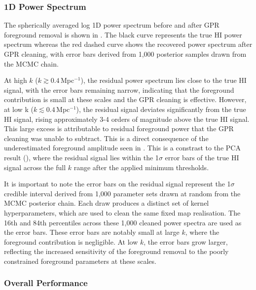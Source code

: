 \subsubsection{1D Power Spectrum}

The spherically averaged log 1D power spectrum before and after GPR foreground removal is shown in . The black curve represents the true HI power spectrum whereas the red dashed curve shows the recovered power spectrum after GPR cleaning, with error bars derived from 1,000 posterior samples drawn from the MCMC chain.

At high $k$ ($k \gtrsim 0.4$\,Mpc$^{-1}$), the residual power spectrum lies close to the true HI signal, with the error bars remaining narrow, indicating that the foreground contribution is small at these scales and the GPR cleaning is effective. However, at low k ($k \lesssim 0.4$\,Mpc$^{-1}$), the residual signal deviates significantly from the true HI signal, rising approximately 3-4 orders of magnitude above the true HI signal. This large excess is attributable to residual foreground power that the GPR cleaning was unable to subtract. This is a direct consequence of the underestimated foreground amplitude seen in . This is a constrast to the PCA result (), where the residual signal lies within the 1$\sigma$ error bars of the true HI signal across the full $k$ range after the applied minimum thresholds.

It is important to note the error bars on the residual signal represent the 1$\sigma$ credible interval derived from 1,000 parameter sets drawn at random from the MCMC posterior chain. Each draw produces a distinct set of kernel hyperparameters, which are used to clean the same fixed map realisation. The 16th and 84th percentiles across these 1,000 cleaned power spectra are used as the error bars. These error bars are notably small at large $k$, where the foreground contribution is negligible. At low $k$, the error bars grow larger, reflecting the increased sensitivity of the foreground removal to the poorly constrained foreground parameters at these scales.

\subsubsection{Overall Performance}

